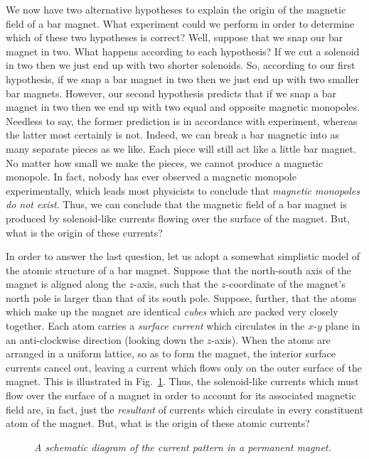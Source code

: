 We now have two alternative hypotheses to explain the origin of the magnetic field of
a bar magnet. What experiment could we perform in order to determine which of these
two hypotheses is  correct? Well, suppose that we snap
our bar magnet in two. What
happens according to each hypothesis? If we cut a solenoid in two then we just end up
with two shorter solenoids. So, according to our first hypothesis,
if we snap a bar magnet in two then we just end up with two smaller bar magnets. 
However, our second hypothesis predicts that if we snap a bar magnet in two
then we end up with two equal and opposite magnetic monopoles. Needless to say,
the former prediction is in accordance with experiment, whereas the latter
most certainly is not. Indeed, we can break a bar magnetic into as many separate
pieces as we like. Each piece will still act like a little bar magnet. 
No matter how
small we make the pieces, we cannot produce a magnetic monopole.
In fact, nobody has ever observed a magnetic monopole
experimentally, which  leads most physicists to conclude that {\em magnetic
monopoles do not exist}. Thus, we can conclude that the magnetic field of
a bar magnet is produced by solenoid-like currents flowing over the
surface of the magnet. But, what is the origin of these currents?

	In order to answer the last question, let us adopt a somewhat simplistic
model of the atomic structure of a bar magnet. Suppose that the north-south axis
of the magnet is aligned along the $z$-axis, such that the $z$-coordinate
of the magnet's north pole is larger
 than that of its south pole. Suppose, further, that the atoms which make up the
magnet are identical {\em cubes}\/ which are packed very closely together. Each atom carries
a {\em surface current}\/  which circulates in the $x$-$y$ plane in an
anti-clockwise direction (looking down the $z$-axis). When the atoms are
arranged in a uniform lattice, so as to form the
magnet, the interior surface currents cancel out, leaving a  current
which flows only on the outer surface of the magnet. This is illustrated in Fig.~\ref{f8.11}.  Thus, the solenoid-like currents which must flow over the
surface of a magnet in order to account for its associated magnetic field are, 
in fact, just the {\em resultant}\/ of currents which circulate in every
constituent  atom of  the magnet. But, what is the origin of these atomic currents?

\begin{figure}[h]
\epsfysize=3in
\centerline{}
\caption{\em A schematic diagram of the current pattern in a permanent magnet.}\label{f8.11}
\end{figure}

